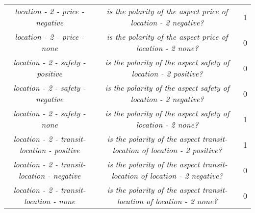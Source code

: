 {{\begin{center}
{\begin{tabular}{|c|c|c|}
		\textit{{\color{black} location - 2} - {\color{cyan} price} - {\color{red} negative}} & \textit{is the polarity of the aspect {\color{cyan} price} of {\color{black} location - 2} {\color{red} negative}?} & 1 \\
		\textit{{\color{black} location - 2} - {\color{cyan} price} - {\color{gray} none}} & \textit{is the polarity of the aspect {\color{cyan} price} of {\color{black} location - 2} {\color{gray} none}?} & 0 \\
		\hline \hline
		\textit{{\color{black} location - 2} - {\color{orange} safety} - {\color{green} positive}} & \textit{is the polarity of the aspect {\color{orange} safety} of {\color{black} location - 2} {\color{green} positive}?} & 0 \\
		\textit{{\color{black} location - 2} - {\color{orange} safety} - {\color{red} negative}} & \textit{is the polarity of the aspect {\color{orange} safety} of {\color{black} location - 2} {\color{red} negative}?} & 0 \\
		\textit{{\color{black} location - 2} - {\color{orange} safety} - {\color{gray} none}} & \textit{is the polarity of the aspect {\color{orange} safety} of {\color{black} location - 2} {\color{gray} none}?} & 1 \\
		\hline \hline
		\textit{{\color{black} location - 2} - {\color{pink} transit-location} - {\color{green} positive}} & \textit{is the polarity of the aspect {\color{pink} transit-location} of {\color{black} location - 2} {\color{green} positive}?} & 1 \\
		\textit{{\color{black} location - 2} - {\color{pink} transit-location} - {\color{red} negative}} & \textit{is the polarity of the aspect {\color{pink} transit-location} of {\color{black} location - 2} {\color{red} negative}?} & 0 \\
		\textit{{\color{black} location - 2} - {\color{pink} transit-location} - {\color{gray} none}} & \textit{is the polarity of the aspect {\color{pink} transit-location} of {\color{black} location - 2} {\color{gray} none}?} & 0 \\
		\hline
	\end{tabular}}
	 \label{table:background:tabsasentencesB}
\end{center}}}
